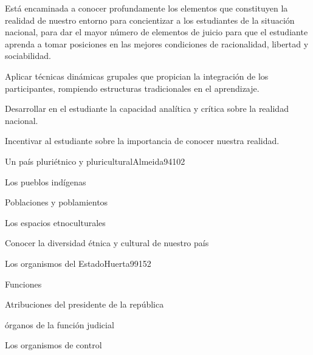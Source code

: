 \begin{syllabus}


\begin{justification}
Está encaminada a conocer profundamente los elementos que constituyen la realidad de 
nuestro entorno para concientizar a los estudiantes de la situación nacional, 
para dar el mayor número de elementos de juicio para que el estudiante aprenda a tomar 
posiciones en las mejores condiciones de racionalidad, libertad y sociabilidad.
\end{justification}

\begin{goals}
\item Aplicar técnicas dinámicas grupales que propician la integración de los participantes, rompiendo estructuras tradicionales en el aprendizaje.
\item Desarrollar en el estudiante la capacidad analítica y crítica sobre la realidad nacional.
\item Incentivar al estudiante sobre la importancia de conocer nuestra realidad.
\end{goals}

\begin{outcomes}
\end{outcomes}

\begin{unit}{Un país pluriétnico y pluricultural}{Almeida94}{10}{2}
   \begin{topics}
	\item Los pueblos indígenas
	\item Poblaciones y poblamientos
	\item Los espacios etnoculturales
   \end{topics}

   \begin{learningoutcomes}
      \item Conocer la diversidad étnica y cultural de nuestro país
   \end{learningoutcomes}
\end{unit}

\begin{unit}{Los organismos del Estado}{Huerta99}{15}{2}
   \begin{topics}
      \item Funciones
	\item Atribuciones del presidente de la república
	\item órganos de la función judicial
	\item Los organismos de control
  \end{topics}


\end{unit}
\end{syllabus}
